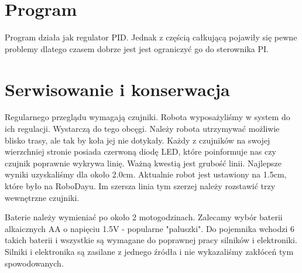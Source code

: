 \documentclass[a4paper,11pt]{article}
\begin{document}
\section{Program}

Program działa jak regulator PID. Jednak z częścią całkującą pojawiły się pewne problemy dlatego czasem dobrze jest jest ograniczyć go do sterownika PI.



\section{Serwisowanie i konserwacja}
Regularnego przeglądu wymagają czujniki. Robota wyposażyliśmy w system do ich regulacji. Wystarczą do tego obcęgi. Należy robota utrzymywać możliwie blisko trasy, ale tak by koła jej nie dotykały. Każdy z czujników na swojej wierzchniej stronie posiada czerwoną diodę LED, które poinformuje nas czy czujnik poprawnie wykrywa linię. Ważną kwestią jest grubość linii. Najlepsze wyniki uzyskaliśmy dla około 2.0cm. Aktualnie robot jest ustawiony na 1.5cm, które było na RoboDayu. Im szersza linia tym szerzej należy rozstawić trzy wewnętrzne czujniki.

Baterie należy wymieniać po około 2 motogodzinach. Zalecamy wybór baterii alkaicznych AA o napięciu 1.5V - popularne "paluszki". Do pojemnika wchodzi 6 takich baterii i wszystkie są wymagane do poprawnej pracy silników i elektroniki. Silniki i elektronika są zasilane z jednego źródła i nie wykazaliśmy zakłóceń tym spowodowanych.
\end{document}
